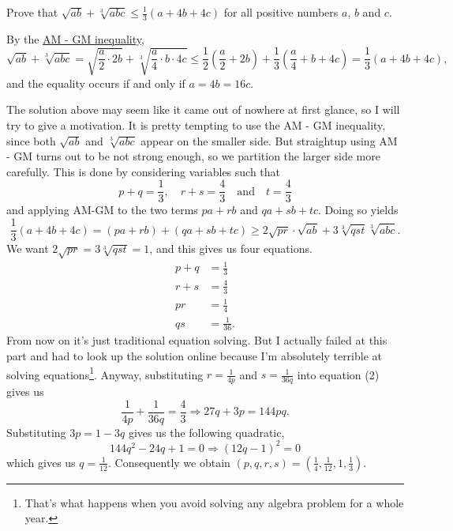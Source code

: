 \begin{question}
    Prove that $\sqrt{ab} + \sqrt[3]{abc} \leq \frac{1}{3}(a + 4b + 4c)$ for
    all positive numbers $a$, $b$ and $c$. 
\end{question}
\begin{solution}
    By the \hyperref[thm: amgm]{AM - GM inequality},
    \[ \sqrt{ab} + \sqrt[3]{abc} = \sqrt{\frac{a}{2} \cdot 2b} +
    \sqrt[3]{\frac{a}{4} \cdot b \cdot 4c} \leq \frac{1}{2} \left( \frac{a}{2}
    + 2b \right) + \frac{1}{3} \left( \frac{a}{4} + b + 4c \right) = \frac{1}{3} (a
    + 4b + 4c), \]
    and the equality occurs if and only if $a = 4b = 16c$.
\end{solution}
\begin{remark}
    The solution above may seem like it came out of nowhere at first glance, so
    I will try to give a motivation. It is pretty tempting to use the AM - GM
    inequality, since both $\sqrt{ab}$ and $\sqrt[3]{abc}$ appear on the
    smaller side. But straightup using AM - GM turns out to be not strong
    enough, so we partition the larger side more carefully. This is done by
    considering variables such that 
    \[ p + q = \frac{1}{3},\quad r + s = \frac{4}{3} \quad \text{and} \quad
    t=\frac{4}{3} \]
    and applying AM-GM to the two terms $pa+rb$ and $qa+sb+tc$. Doing so yields
    \[ \frac{1}{3}(a + 4b + 4c) = (pa + rb) + (qa + sb + tc)\geq
    2\sqrt{pr}\cdot \sqrt{ab} + 3\sqrt[3]{qst}\sqrt[3]{abc}. \]
    We want $2\sqrt{pr} = 3\sqrt[3]{qst} = 1$, and this gives us four equations.
    \setcounter{equation}{0}
    \begin{align}
    p+q&=\frac{1}{3}\\
    r+s&=\frac{4}{3}\\
    pr&=\frac{1}{4}\\
    qs&=\frac{1}{36}.
    \end{align}
    From now on it's just traditional equation solving. But I actually failed
    at this part and had to look up the solution online because I'm absolutely
    terrible at solving equations\footnote{That's what happens when you avoid solving
    any algebra problem for a whole year.}. Anyway, substituting $r =
    \frac{1}{4p}$ and $s = \frac{1}{36q}$ into equation (2) gives us 
    \[ \frac{1}{4p} + \frac{1}{36q} = \frac{4}{3}\Longrightarrow 27q + 3p =
    144pq. \]
    Substituting $3p = 1 - 3q$ gives us the following quadratic, 
    \[144q^2 - 24q + 1 = 0 \Longrightarrow (12q - 1)^2 = 0\] 
    which gives us $q = \frac{1}{12}$. Consequently we obtain
    $(p,q,r,s) = (\frac{1}{4}, \frac{1}{12}, 1, \frac{1}{3})$.
\end{remark}

